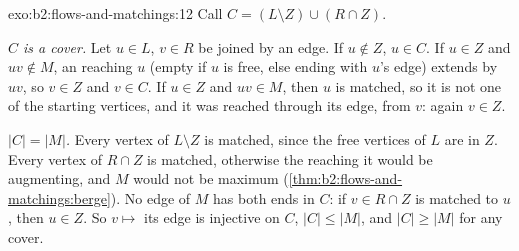 \begin{solution}{exo:b2:flows-and-matchings:12}
Call $C = (L \setminus Z) \cup (R \cap Z)$.

\emph{$C$ is a cover.} Let $u \in L$, $v \in R$ be joined by an edge. If $u \notin Z$, $u \in C$. If $u \in Z$ and $uv
\notin M$, an  reaching $u$ (empty if $u$ is free, else ending with $u$'s  edge) extends by $uv$,
so $v \in Z$ and $v \in C$. If $u \in Z$ and $uv \in M$, then $u$ is matched, so it is not one of the starting vertices,
and it was reached through its  edge, from $v$: again $v \in Z$.

\emph{$|C| = |M|$.} Every vertex of $L \setminus Z$ is matched, since the free vertices of $L$ are in $Z$. Every vertex of
$R \cap Z$ is matched, otherwise the  reaching it would be augmenting, and $M$ would not be maximum
(\cref{thm:b2:flows-and-matchings:berge}). No edge of $M$ has both ends in $C$: if $v \in R \cap Z$ is matched to $u$,
then $u \in Z$. So $v \mapsto$ its  edge is injective on $C$, $|C| \leq |M|$, and $|C| \geq |M|$ for any cover.


\end{solution}

